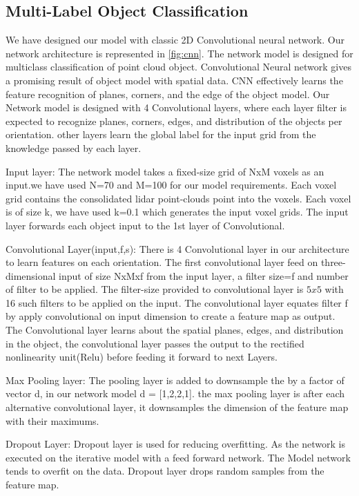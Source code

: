 
\subsection{Multi-Label Object Classification}

We have designed our model with classic 2D Convolutional neural network.
Our network architecture is represented in \ref{fig:cnn}.
The network model is designed for multiclass classification of point cloud object. Convolutional Neural network gives a promising result of object model with spatial data. CNN effectively learns the feature recognition of planes, corners, and the edge of the object model. Our Network model is designed with 4 Convolutional layers, where each layer filter is expected to recognize
planes, corners, edges, and distribution of the objects per orientation.
other layers learn the global label for the input grid from the knowledge passed by each layer.

Input layer:
The network model takes a fixed-size grid of NxM voxels as an input.we have used N=70 and M=100 for our model requirements.
Each voxel grid contains the consolidated lidar point-clouds point into the voxels. Each voxel is of size k, we have used k=0.1
which generates the input voxel grids. The input layer forwards each object input to the 1st layer of Convolutional.


Convolutional Layer(input,f,s):
There is 4 Convolutional layer in our architecture to learn features on each orientation.
The first convolutional layer feed on three-dimensional input of size NxMxf from the input layer, a filter size=f and number of filter to be applied.
The filter-size provided to convolutional layer is $5x5$ with 16 such filters to be applied on the input.
The convolutional layer equates filter f by apply convolutional on input dimension to create a feature map as output.
The Convolutional layer learns about the spatial planes, edges, and distribution in the object, the convolutional layer passes the output to the rectified nonlinearity unit(Relu) before feeding it forward to next Layers.

Max Pooling layer:
The pooling layer is added to downsample the by a factor of vector d, in our network model d = [1,2,2,1].
the max pooling layer is after each alternative convolutional layer, it downsamples the dimension of the feature map with their maximums.

Dropout Layer:
Dropout layer is used for reducing overfitting. As the network is executed on the iterative model with a feed forward network.
The Model network tends to overfit on the data. Dropout layer drops random samples from the feature map.


